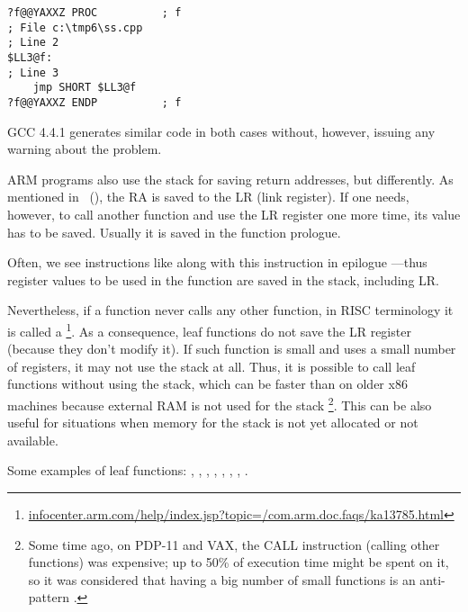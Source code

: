 \begin{lstlisting}
?f@@YAXXZ PROC			; f
; File c:\tmp6\ss.cpp
; Line 2
$LL3@f:
; Line 3
	jmp	SHORT $LL3@f
?f@@YAXXZ ENDP			; f
\end{lstlisting}

GCC 4.4.1 generates similar code in both cases without, however,  issuing any warning about the problem.


ARM programs also use the stack for saving return addresses, but differently.
As mentioned in \q{\HelloWorldSectionName}~(),
the \ac{RA} is saved to the \ac{LR} (\gls{link register}).
If one needs, however, to call another function and use the \ac{LR} register
one more time, its value has to be saved.
Usually it is saved in the function prologue.

Often, we see instructions like  along with this instruction in epilogue
---thus register values to be used in the function are saved in the stack, including \ac{LR}.

Nevertheless, if a function never calls any other function, in \ac{RISC} terminology it is called a
\footnote{\href{http://go.yurichev.com/17064}{infocenter.arm.com/help/index.jsp?topic=/com.arm.doc.faqs/ka13785.html}}. 
As a consequence, leaf functions do not save the \ac{LR} register (because they don't modify it).
If such function is small and uses a small number of registers, it may not use the stack at all.
Thus, it is possible to call leaf functions without using the stack,
which can be faster than on older x86 machines because external RAM is not used for the stack
\footnote{Some time ago, on PDP-11 and VAX, the CALL instruction (calling other functions) was expensive; up to 50\%
of execution time might be spent on it, so it was considered that having a big number of small functions is an \gls{anti-pattern} .}.
This can be also useful for situations when memory for the stack is not yet allocated or not available.

Some examples of leaf functions:
, , 
, , ,
, , .

